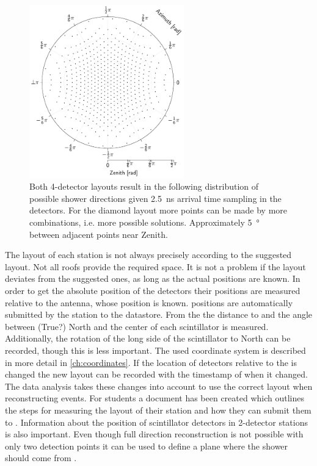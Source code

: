 \begin{figure}
    \centering
    \includegraphics[width=0.6\textwidth]
                    {plots/station/discrete_directions}
    \caption{Both 4-detector layouts result in the following distribution of possible shower directions given \SI{2.5}{\ns} arrival time sampling in the detectors. For the diamond layout more points can be made by more combinations, i.e. more possible solutions. Approximately \SI{5}{\degree} between adjacent points near Zenith.}
    \label{fig:discrete_directions}
\end{figure}

The layout of each station is not always precisely according to the suggested layout. Not all roofs provide the required space. It is not a problem if the layout deviates from the suggested ones, as long as the actual positions are known. In order to get the absolute position of the detectors their positions are measured relative to the \gps antenna, whose position is known. \gps positions are automatically submitted by the station to the datastore. From the \gps the distance to and the angle between (True?) North and the center of each scintillator is measured. Additionally, the rotation of the long side of the scintillator to North can be recorded, though this is less important. The used coordinate system is described in more detail in \cref{ch:coordinates}. If the location of detectors relative to the \gps is changed the new layout can be recorded with the timestamp of when it changed. The data analysis takes these changes into account to use the correct layout when reconstructing events. For students a document has been created which outlines the steps for measuring the layout of their station and how they can submit them to \hisparc. Information about the position of scintillator detectors in 2-detector stations is also important. Even though full direction reconstruction is not possible with only two detection points it can be used to define a plane where the shower should come from \cite{schultheiss2016pair}.

